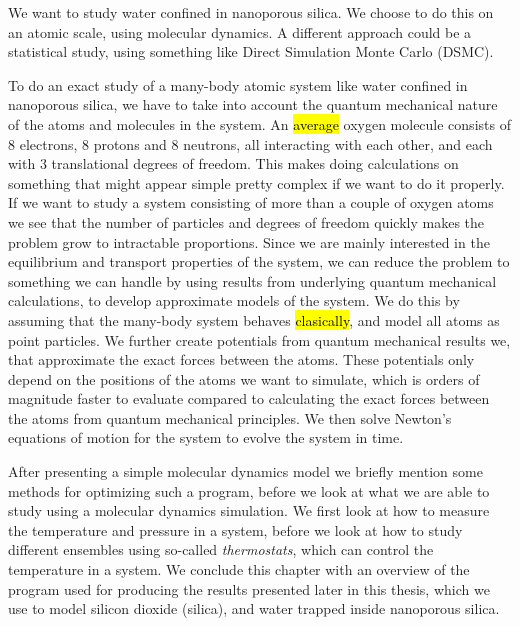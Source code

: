 We want to study water confined in nanoporous silica. We choose to do this on an atomic scale, using molecular dynamics. A different approach could be a statistical study, using something like Direct Simulation Monte Carlo (DSMC).

To do an exact study of a many-body atomic system like water confined in nanoporous silica, we have to take into account the quantum mechanical nature of the atoms and molecules in the system. An \hl{average} oxygen molecule consists of 8 electrons, 8 protons and 8 neutrons, all interacting with each other, and each with 3 translational degrees of freedom. This makes doing calculations on something that might appear simple pretty complex if we want to do it properly. If we want to study a system consisting of more than a couple of oxygen atoms we see that the number of particles and degrees of freedom quickly makes the problem grow to intractable proportions. Since we are mainly interested in the equilibrium and transport properties of the system, we can reduce the problem to something we can handle by using results from underlying quantum mechanical calculations, to develop approximate models of the system. We do this by assuming that the many-body system behaves \hl{clasically}, and model all atoms as point particles. We further create potentials from quantum mechanical results we, that approximate the exact forces between the atoms. These potentials only depend on the positions of the atoms we want to simulate, which is orders of magnitude faster to evaluate compared to calculating the exact forces between the atoms from quantum mechanical principles. We then solve Newton's equations of motion for the system to evolve the system in time.


After presenting a simple molecular dynamics model we briefly mention some methods for optimizing such a program, before we look at what we are able to study using a molecular dynamics simulation. We first look at how to measure the temperature and pressure in a system, before we look at how to study different ensembles using so-called \emph{thermostats}, which can control the temperature in a system. We conclude this chapter with an overview of the program used for producing the results presented later in this thesis, which we use to model silicon dioxide (silica), and water trapped inside nanoporous silica.